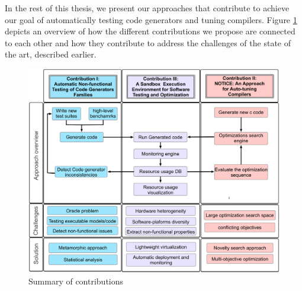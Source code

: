 

In the rest of this thesis, we present our approaches that contribute to achieve our goal of automatically testing code generators and tuning compilers. Figure \ref{fig:overview} depicts an overview of how the different contributions we propose are connected to each other and how they contribute to address the challenges of the state of the art, described earlier.

\begin{figure}[h]
	\center
	\includegraphics[scale=0.23]{Chapitre0/fig/overview}
	\caption{Summary of contributions}
	\label{fig:overview}
\end{figure}

